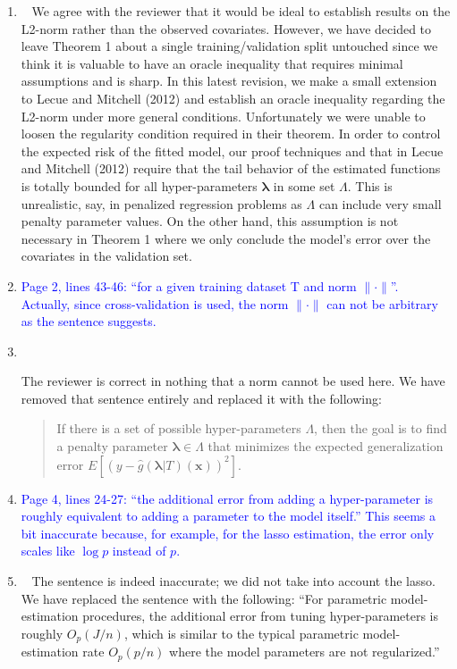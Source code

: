\documentclass[]{article}
\newcommand{\point}[1]{\item \textcolor{blue}{#1}}
\newcommand{\reply}{\item[]\ }
\begin{document}
\begin{enumerate}
		\reply{
			We agree with the reviewer that it would be ideal to establish results on the L2-norm rather than the observed covariates.
			However, we have decided to leave Theorem 1 about a single training/validation split untouched since we think it is valuable to have an oracle inequality that requires minimal assumptions and is sharp.
			In this latest revision, we make a small extension to Lecue and Mitchell (2012) and establish an oracle inequality regarding the L2-norm under more general conditions.
			Unfortunately we were unable to loosen the regularity condition required in their theorem.
			In order to control the expected risk of the fitted model, our proof techniques and that in Lecue and Mitchell (2012) require that the tail behavior of the estimated functions is totally bounded for all hyper-parameters $\boldsymbol{\lambda}$ in some set $\Lambda$.
			This is unrealistic, say, in penalized regression problems as $\Lambda$ can include very small penalty parameter values.
			On the other hand, this assumption is not necessary in Theorem 1 where we only conclude the model's error over the covariates in the validation set.
		}

		\point{
			Page 2, lines 43-46: “for a given training dataset T and norm $\|\cdot \|$”. Actually, since cross-validation is used, the norm $\|\cdot \|$ can not be arbitrary as the sentence suggests.
		}

		\reply{
			The reviewer is correct in nothing that a norm cannot be used here.
			We have removed that sentence entirely and replaced it with the following:
			\begin{quote}
			If there is a set of possible hyper-parameters $\Lambda$, then the goal is to find a penalty parameter $\boldsymbol{\lambda} \in \Lambda$ that minimizes the expected generalization error
			$
			E \left [
			\left ( y - \hat{g}(\boldsymbol{\lambda} | T)(\boldsymbol{x}) \right )^2
			\right ].
			$
		\end{quote}
		
		}

		\point{
			Page 4, lines 24-27: “the additional error from adding a hyper-parameter is roughly equivalent to adding a parameter to the model itself.” This seems a bit inaccurate because, for example, for the lasso estimation, the error only scales like $\log p$ instead of $p$.
		}

		\reply {
			The sentence is indeed inaccurate; we did not take into account the lasso.
			We have replaced the sentence with the following: ``For parametric model-estimation procedures, the additional error from tuning hyper-parameters is roughly $O_p(J/n)$, which is similar to the typical parametric model-estimation rate $O_p(p/n)$ where the model parameters are not regularized.''
		}


\end{enumerate}
\end{document}
